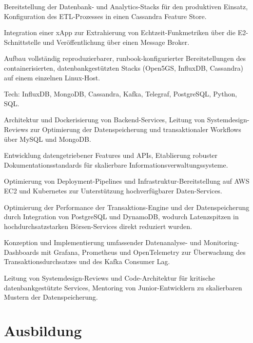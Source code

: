 \documentclass[10pt,a4paper]{resume}
\begin{document}
\bullets
  \item Bereitstellung der Datenbank- und Analytics-Stacks für den produktiven Einsatz, Konfiguration des ETL-Prozesses in einen Cassandra Feature Store.
  \item Integration einer xApp zur Extrahierung von Echtzeit-Funkmetriken über die E2-Schnittstelle und Veröffentlichung über einen Message Broker.
  \item Aufbau vollständig reproduzierbarer, runbook-konfigurierter Bereitstellungen des containerisierten, datenbankgestützten Stacks (Open5GS, InfluxDB, Cassandra) auf einem einzelnen Linux-Host.
  \item Tech: InfluxDB, MongoDB, Cassandra, Kafka, Telegraf, PostgreSQL, Python, SQL.
\bulletsend
\vspace{1.5pt}
\bullets
  \item Architektur und Dockerisierung von Backend-Services, Leitung von Systemdesign-Reviews zur Optimierung der Datenspeicherung und transaktionaler Workflows über MySQL und MongoDB.
  \item Entwicklung datengetriebener Features und APIs, Etablierung robuster Dokumentationsstandards für skalierbare Informationsverwaltungssysteme.
  \item Optimierung von Deployment-Pipelines und Infrastruktur-Bereitstellung auf AWS EC2 und Kubernetes zur Unterstützung hochverfügbarer Daten-Services.
\bulletsend
\vspace{1.5pt}
\bullets
  \item Optimierung der Performance der Transaktions-Engine und der Datenspeicherung durch Integration von PostgreSQL und DynamoDB, wodurch Latenzspitzen in hochdurchsatzstarken Börsen-Services direkt reduziert wurden.
  \item Konzeption und Implementierung umfassender Datenanalyse- und Monitoring-Dashboards mit Grafana, Prometheus und OpenTelemetry zur Überwachung des Transaktionsdurchsatzes und des Kafka Consumer Lag.
  \item Leitung von Systemdesign-Reviews und Code-Architektur für kritische datenbankgestützte Services, Mentoring von Junior-Entwicklern zu skalierbaren Mustern der Datenspeicherung.
\bulletsend
\vspace{1.5pt}

\section{Ausbildung}
\end{document}
